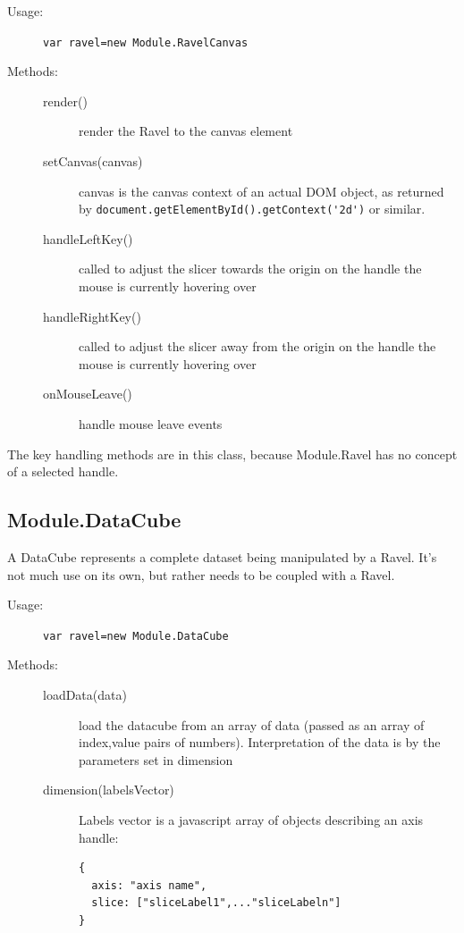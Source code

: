 \documentclass{article}
\begin{document}
\begin{description}
\item[Usage:] \verb+var ravel=new Module.RavelCanvas+

\item[Methods:]\mbox{}
\begin{description}
\item[render()] render the Ravel to the canvas element
\item[setCanvas(canvas)] canvas is the canvas context of an actual DOM object, as returned
  by \verb+document.getElementById().getContext('2d')+ or similar.
\item[handleLeftKey()] called to adjust the slicer towards the origin
  on the handle the mouse is currently hovering over
\item[handleRightKey()] called to adjust the slicer away from the origin
  on the handle the mouse is currently hovering over
\item[onMouseLeave()] handle mouse leave events
\end{description}
\end{description}

The key handling methods are in this class, because Module.Ravel has
no concept of a selected handle.

\subsection{Module.DataCube}

A DataCube represents a complete dataset being manipulated by a
Ravel. It's not much use on its own, but rather needs to be coupled
with a Ravel.

\begin{description}
\item[Usage:] \verb+var ravel=new Module.DataCube+

\item[Methods:]\mbox{}
\begin{description}
\item[loadData(data)] load the datacube from an array of data
  (passed as an array of index,value pairs of numbers). Interpretation of the data is by the
  parameters set in dimension
\item[dimension(labelsVector)] Labels vector is a javascript array of
  objects describing an axis handle:
\begin{verbatim}
{
  axis: "axis name",
  slice: ["sliceLabel1",..."sliceLabeln"]
} 
\end{verbatim}
\end{description}
\end{description}
\end{document}
